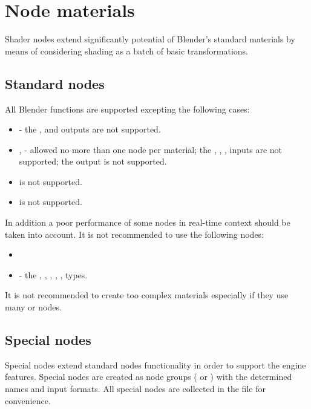 \documentclass[a4paper,12pt,oneside]{sphinxmanual}
\begin{document}
\chapter{Node materials}
\label{node_materials:index-0}\label{node_materials::doc}\label{node_materials:id1}
Shader nodes extend significantly potential of Blender's standard materials by means of considering shading as a batch of basic transformations.


\section{Standard nodes}
\label{node_materials:id2}\label{node_materials:index-1}\label{node_materials:generic-node-materials}
All Blender functions are supported excepting the following cases:
\begin{itemize}
\item {} 
 - the ,  and  outputs are not supported.

\item {} 
,  - allowed no more than one node per material; the , , ,  inputs are not supported; the  output is not supported.

\item {} 
 is not supported.

\item {} 
 is not supported.

\end{itemize}

In addition a poor performance of some nodes in real-time context should be taken into account. It is not recommended to use the following nodes:
\begin{itemize}
\item {} 

\item {} 
 - the , , , , ,  types.

\end{itemize}

It is not recommended to create too complex materials especially if they use many  or  nodes.


\section{Special nodes}
\label{node_materials:custom-node-materials}\label{node_materials:id3}
Special nodes extend standard nodes functionality in order to support the engine features. Special nodes are created as node groups ( or ) with the determined names and input formats. All special nodes are collected in the  file for convenience.
\end{document}
